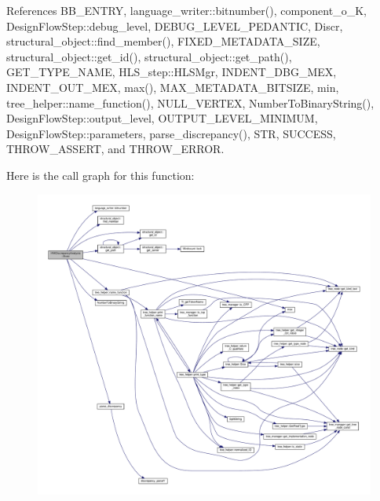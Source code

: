 References B\+B\+\_\+\+E\+N\+T\+RY, language\+\_\+writer\+::bitnumber(), component\+\_\+o\+\_\+K, Design\+Flow\+Step\+::debug\+\_\+level, D\+E\+B\+U\+G\+\_\+\+L\+E\+V\+E\+L\+\_\+\+P\+E\+D\+A\+N\+T\+IC, Discr, structural\+\_\+object\+::find\+\_\+member(), F\+I\+X\+E\+D\+\_\+\+M\+E\+T\+A\+D\+A\+T\+A\+\_\+\+S\+I\+ZE, structural\+\_\+object\+::get\+\_\+id(), structural\+\_\+object\+::get\+\_\+path(), G\+E\+T\+\_\+\+T\+Y\+P\+E\+\_\+\+N\+A\+ME, H\+L\+S\+\_\+step\+::\+H\+L\+S\+Mgr, I\+N\+D\+E\+N\+T\+\_\+\+D\+B\+G\+\_\+\+M\+EX, I\+N\+D\+E\+N\+T\+\_\+\+O\+U\+T\+\_\+\+M\+EX, max(), M\+A\+X\+\_\+\+M\+E\+T\+A\+D\+A\+T\+A\+\_\+\+B\+I\+T\+S\+I\+ZE, min, tree\+\_\+helper\+::name\+\_\+function(), N\+U\+L\+L\+\_\+\+V\+E\+R\+T\+EX, Number\+To\+Binary\+String(), Design\+Flow\+Step\+::output\+\_\+level, O\+U\+T\+P\+U\+T\+\_\+\+L\+E\+V\+E\+L\+\_\+\+M\+I\+N\+I\+M\+UM, Design\+Flow\+Step\+::parameters, parse\+\_\+discrepancy(), S\+TR, S\+U\+C\+C\+E\+SS, T\+H\+R\+O\+W\+\_\+\+A\+S\+S\+E\+RT, and T\+H\+R\+O\+W\+\_\+\+E\+R\+R\+OR.

Here is the call graph for this function\+:
\nopagebreak
\begin{figure}[H]
\begin{center}
\leavevmode
\includegraphics[width=350pt]{da/d34/classHWDiscrepancyAnalysis_ab5f7d26b554925eb5a558fcfeaaf01d2_cgraph}
\end{center}
\end{figure}
\mbox{\label{classHWDiscrepancyAnalysis_a9cc845a4b074af79cc881f8bc021de55}} 
